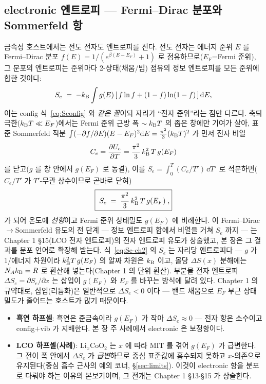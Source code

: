 \subsection{electronic 엔트로피 --- Fermi--Dirac 분포와 Sommerfeld 항}\label{ssec:elec}
금속성 호스트에서는 전도 전자도 엔트로피를 진다. 전도 전자는 에너지 준위 $E$ 를 Fermi--Dirac 분포
$f(E)=1/(e^{\beta(E-E_F)}+1)$ 로 점유하므로($E_F$=Fermi 준위), 그 분포의 엔트로피는 준위마다 2-상태(채움/빔)
점유의 정보 엔트로피를 모든 준위에 합한 것이다:
\begin{equation}
S_e \;=\; -k_{\mathrm B}\int g(E)\,[\,f\ln f+(1-f)\ln(1-f)\,]\,\mathrm{d} E,
\label{eq:Se_start}
\end{equation}
이는 config 식~\eqref{eq:Sconfig} 와 \emph{같은 꼴}이되 자리가 ``전자 준위''라는 점만 다르다. 축퇴 극한($k_{\mathrm B}
T\ll E_F$)에서는 Fermi 준위 근방 폭 $\sim k_{\mathrm B} T$ 의 좁은 창에만 기여가 살아, 표준 Sommerfeld 적분
$\int(-\partial f/\partial E)(E-E_F)^2\mathrm{d} E=\tfrac{\pi^2}{3}(k_{\mathrm B} T)^2$ 가 먼저 전자 비열
\[
C_e=\frac{\partial U_e}{\partial T}=\frac{\pi^2}{3}\,k_{\mathrm B}^2\,T\,g(E_F)
\]
를 닫고($g$ 를 창 안에서 $g(E_F)$ 로 동결), 이를 $S_e=\int_0^T (C_e/T')\,\dd T'$ 로 적분하면($C_e/T'$ 가
$T'$-무관 상수이므로 곧바로 닫혀)
\begin{equation}
\boxed{\;S_e \;=\; \frac{\pi^2}{3}\,k_{\mathrm B}^2\,T\,g(E_F)\;,}
\label{eq:Se-ch2}
\end{equation}
가 되어 온도에 \emph{선형}이고 Fermi 준위 상태밀도 $g(E_F)$ 에 비례한다. 이 Fermi--Dirac$\to$Sommerfeld
유도의 전 단계 --- 정보 엔트로피 합에서 비열을 거쳐 $S_e$ 까지 --- 는 Chapter 1 §15(LCO 전자 엔트로피)의 전자
엔트로피 유도가 상술했고, 본 장은 그 결과를 분포 언어로 확장해 받는다. 식~\eqref{eq:Se-ch2} 의 $S_e$ 는 자리당
엔트로피다 --- $g$ 가 1/에너지 차원이라 $k_{\mathrm B}^2 T\,g(E_F)$ 의 알짜 차원은 $k_{\mathrm B}$ 이고, 몰당 $\Delta S(x)$ 분해에는
$N_Ak_{\mathrm B}=R$ 로 환산해 넣는다(Chapter 1 의 단위 환산). 부분몰 전자 엔트로피 $\Delta S_e=\partial S_e/\partial x$
는 삽입이 $g(E_F)$ 와 $E_F$ 를 바꾸는 방식에 달려 있다. Chapter 1 의 규약대로, 삽입(리튬화)은 일반적으로
$\Delta S_e<0$ 이다 --- 밴드 채움으로 $E_F$ 부근 상태밀도가 줄어드는 호스트가 많기 때문이다.
\begin{itemize}[leftmargin=1.4em,itemsep=1pt]
\item \textbf{흑연 하프셀}: 흑연은 준금속이라 $g(E_F)$ 가 작아 $\Delta S_e\approx0$ --- 전자 항은 소수이고
config$+$vib 가 지배한다. 본 장 주 사례에서 electronic 은 보정항이다.
\item \textbf{LCO 하프셀(사례)}: Li$_x$CoO$_2$ 는 $x$ 에 따라 MIT 를 겪어 $g(E_F)$ 가 급변한다. 그 전이 폭
안에서 $\Delta S_e$ 가 \emph{급변}하므로 중심 표준값에 흡수되지 못하고 $x$-의존으로 유지된다(중심 흡수 근사의
예외 코너, \S\ref{sec:limits}). 이것이 electronic 항을 분포로 다뤄야 하는 이유의 본보기이며, 그 전개는
Chapter 1 §13$\cdot$§15 가 상술한다.
\end{itemize}

